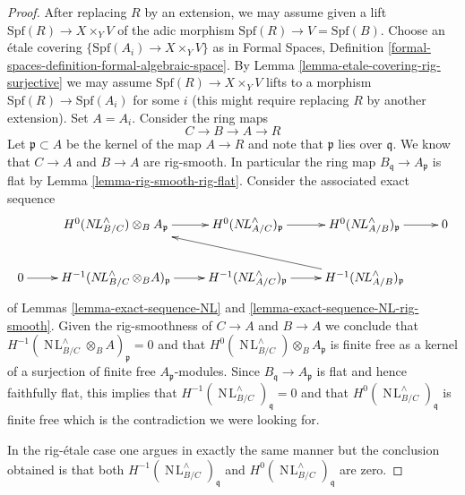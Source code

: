\documentclass{stacks-project}
\theoremstyle{plain}
\theoremstyle{definition}
\theoremstyle{remark}
\numberwithin{equation}{subsection}
\def\NL{\mathop{N\!L}\nolimits}
\begin{document}
\begin{proof}
\medskip\noindent
After replacing $R$ by an extension, we may assume given a lift
$\text{Spf}(R) \to X \times_Y V$ of the adic morphism
$\text{Spf}(R) \to V = \text{Spf}(B)$. Choose an \'etale
covering $\{\text{Spf}(A_i) \to X \times_Y V\}$ as in
Formal Spaces, Definition
\ref{formal-spaces-definition-formal-algebraic-space}.
By Lemma \ref{lemma-etale-covering-rig-surjective}
we may assume $\text{Spf}(R) \to X \times_Y V$ lifts to a
morphism $\text{Spf}(R) \to \text{Spf}(A_i)$ for some $i$
(this might require replacing $R$ by another extension).
Set $A = A_i$. Consider the ring maps
$$
C \to B \to A \to R
$$
Let $\mathfrak p \subset A$ be the kernel of the map
$A \to R$ and note that $\mathfrak p$ lies over $\mathfrak q$.
We know that $C \to A$ and $B \to A$ are rig-smooth.
In particular the ring map $B_\mathfrak q \to A_\mathfrak p$
is flat by Lemma \ref{lemma-rig-smooth-rig-flat}.
Consider the associated exact sequence
$$
\xymatrix{
&
H^0(\NL_{B/C}^\wedge) \otimes_B A_\mathfrak p \ar[r] &
H^0(\NL_{A/C}^\wedge)_\mathfrak p \ar[r] &
H^0(\NL_{A/B}^\wedge)_\mathfrak p \ar[r] & 0 \\
0 \ar[r] &
H^{-1}(\NL_{B/C}^\wedge \otimes_B A)_\mathfrak p \ar[r] &
H^{-1}(\NL_{A/C}^\wedge)_\mathfrak p \ar[r] &
H^{-1}(\NL_{A/B}^\wedge)_\mathfrak p \ar[llu]
}
$$
of Lemmas \ref{lemma-exact-sequence-NL} and
\ref{lemma-exact-sequence-NL-rig-smooth}.
Given the rig-smoothness of $C \to A$ and $B \to A$
we conclude that $H^{-1}(\NL_{B/C}^\wedge \otimes_B A)_\mathfrak p = 0$
and that $H^0(\NL_{B/C}^\wedge) \otimes_B A_\mathfrak p$
is finite free as a kernel of a surjection of finite free
$A_\mathfrak p$-modules. Since $B_\mathfrak q \to A_\mathfrak p$
is flat and hence faithfully flat, this implies that
$H^{-1}(\NL_{B/C}^\wedge)_\mathfrak q = 0$
and that $H^0(\NL_{B/C}^\wedge)_\mathfrak q$
is finite free which is the contradiction we were looking for.

\medskip\noindent
In the rig-\'etale case one argues in exactly the same manner
but the conclusion obtained is that both
$H^{-1}(\NL_{B/C}^\wedge)_\mathfrak q$
and $H^0(\NL_{B/C}^\wedge)_\mathfrak q$ are zero.
\end{proof}
\end{document}

